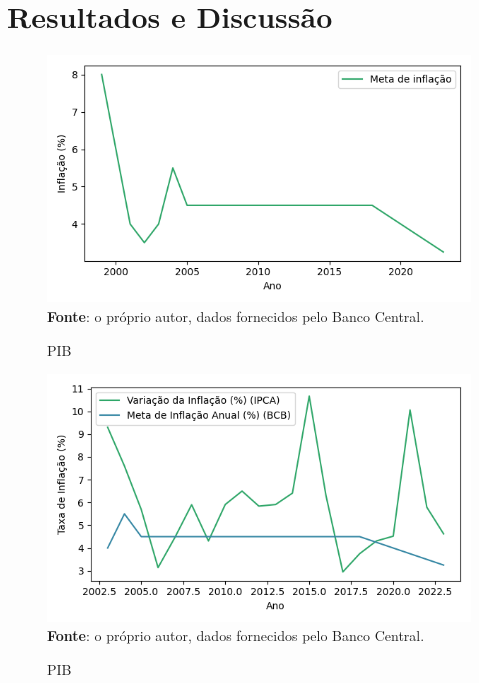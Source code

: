 \documentclass[12pt,oneside,a4paper,chapter=TITLE,english,brazil,sumario=abnt-6027-2012]{abntex2}
\begin{document}
\section{Resultados e Discussão}

\begin{figure}[H]
	
	\caption{PIB}
	
	\includegraphics[]{fig/meta_infl_annum_99_23.png}\\
	
	\footnotesize \textbf{Fonte}: o próprio autor, dados fornecidos pelo Banco Central.
	
\end{figure}

\begin{figure}[H]
	
	\caption{PIB}
	
	\includegraphics[]{fig/ibge_ipca_bcb_meta_99_23_t.png}\\
	
	\footnotesize \textbf{Fonte}: o próprio autor, dados fornecidos pelo Banco Central.
	
\end{figure}
\end{document}
